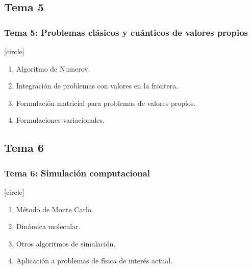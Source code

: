 \documentclass[12pt]{beamer}
\begin{document}
\subsection*{Tema 5}
\begin{frame}
\frametitle{\textbf{Tema 5: Problemas clásicos y cuánticos de valores propios}}
[circle]
\begin{enumerate}[<+->]
\item Algoritmo de Numerov.
\item Integración de problemas con valores en la frontera.
\item Formulación matricial para problemas de valores propios.
\item Formulaciones variacionales.
\end{enumerate}
\end{frame}
\subsection*{Tema 6}
\begin{frame}
\frametitle{\textbf{Tema 6: Simulación computacional}}
[circle]
\begin{enumerate}[<+->]
\item Método de Monte Carlo.
\item Dinámica molecular.
\item Otros algoritmos de simulación.
\item Aplicación a problemas de física de interés actual.
\end{enumerate}
\end{frame}
\end{document}
